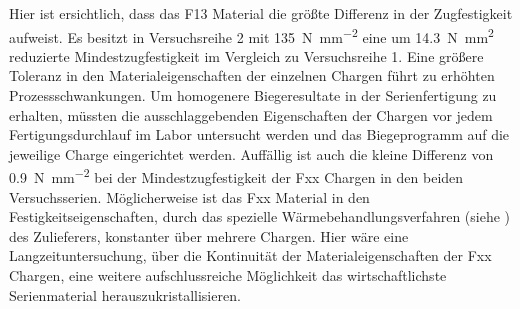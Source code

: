 \documentclass[12pt,a4paper,parskip,twoside,BCOR5mm,headsepline]{scrartcl}
\begin{document}
Hier ist ersichtlich, dass das F13 Material die größte Differenz in der Zugfestigkeit aufweist. Es besitzt in Versuchsreihe 2 mit  \SI{135}{\newton\per\milli\meter\squared} eine um \SI{14,3}{\newton\milli\meter\squared} reduzierte Mindestzugfestigkeit im Vergleich zu Versuchsreihe 1. Eine größere Toleranz in den Materialeigenschaften der einzelnen Chargen führt zu erhöhten Prozessschwankungen. Um homogenere Biegeresultate in der Serienfertigung zu erhalten,  müssten die ausschlaggebenden Eigenschaften der Chargen vor jedem Fertigungsdurchlauf im Labor untersucht werden und das Biegeprogramm auf die jeweilige Charge eingerichtet werden. Auffällig ist auch die kleine Differenz von \SI{0,9}{\newton\per\milli\meter\squared} bei der Mindestzugfestigkeit der Fxx Chargen in den beiden Versuchsserien. Möglicherweise ist das Fxx Material in den Festigkeitseigenschaften,  durch das spezielle Wärmebehandlungsverfahren (siehe ) des Zulieferers, konstanter über mehrere Chargen. Hier wäre eine Langzeituntersuchung,  über die Kontinuität der Materialeigenschaften der Fxx Chargen,  eine weitere aufschlussreiche Möglichkeit das wirtschaftlichste Serienmaterial herauszukristallisieren. 
  





\newpage
\end{document}
